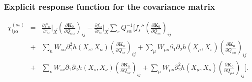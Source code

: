 \subsubsection*{Explicit response function for the covariance matrix}
\begin{eqnarray}
    \chi_{ij\alpha}^{(ss)} &=& \frac{\partial f'_\alpha}{\partial r_\alpha} \Big|_{\vec{X}}\left( \frac{\partial \mathbf{K}_0}{\partial Q_{\alpha\alpha}} \right)_{ij}-\frac{\partial f_\alpha}{\partial r_\alpha} \Big|_{\vec{X}} \sum_s Q^{-1}_{s\alpha} \Bigg[ f_s''\left( \frac{\partial \mathbf{K}_0}{\partial Q_{ss}} \right)_{ij}\nonumber\\
    &+& \sum_n W_{sn} \partial_1^2 h(X_s, X_n) \left( \frac{\partial \mathbf{K}_0}{\partial Q_{ss}} \right)_{ij}+\sum_\mu W_{\mu s} \partial_1 \partial_2 h(X_\mu, X_s) \left( \frac{\partial \mathbf{K}_0}{\partial Q_{\mu\mu}} \right)_{ij}\nonumber\\
    &+& \sum_\nu W_{s\nu} \partial_1\partial_2 h(X_s, X_\nu) \left( \frac{\partial \mathbf{K}_0}{\partial Q_{s\nu}} \right)_{ij} + \sum_\mu W_{\mu s} \partial^2_2 h(X_\mu, X_s) \left( \frac{\partial \mathbf{K}_0}{\partial Q_{\mu s}} \right)_{ij} \Bigg]. \label{chiKodr_ss_appB}
\end{eqnarray}
